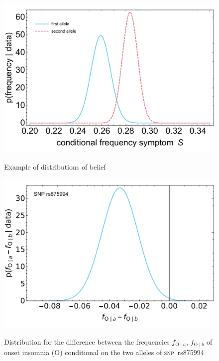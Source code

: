 \documentclass[\ifafour a4paper,12pt,\else a5paper,10pt,\fi%
onecolumn,oneside,article,%
british%
]{memoir}
\theoremstyle{remark}
\theoremstyle{innote}
\renewcommand*{\|}{\mathpunct{|}}
\newcommand*{\snp}{\textsc{snp}}
\newcommand*{\ya}{a}
\newcommand*{\yb}{b}
\newcommand*{\ysA}{\textrm{O}}%
\begin{document}
\begin{figure}[b!]%
 \centering\includegraphics[width=0.75\linewidth]{example_distr_condfreqs.pdf}\\
\caption{Example of distributions of belief}\label{fig:example_distributions}
\end{figure}%



\begin{figure}[b!]%
 \centering\includegraphics[width=0.75\linewidth]{difference_symA_snp6.pdf}\\
 \caption{Distribution for the difference between the frequencies
   $f_{\ysA\|\ya}$, $f_{\ysA\|\yb}$ of onset insomnia ($\ysA$) conditional on
   the two alleles of \snp\ rs875994}\label{fig:example_difference_distributions}
\end{figure}%

\newpage
\appendix
\end{document}
